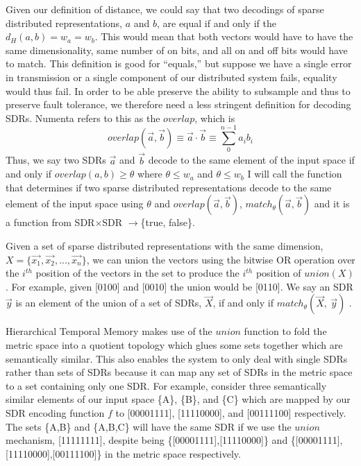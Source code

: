 \documentclass[fleqn,minimal]{article}
\begin{document}
	Given our definition of distance, we could say that two decodings of sparse distributed representations, $a$ and $b$, are equal if and only if the $d_{H}(a,b) = w_{a} = w_{b}$. This would mean that both vectors would have to have the same dimensionality, same number of on bits, and all on and off bits would have to match. This definition is good for ``equals,'' but suppose we have a single error in transmission or a single component of our distributed system fails, equality would thus fail. In order to be able preserve the ability to subsample and thus to preserve fault tolerance, we therefore need a less stringent definition for decoding SDRs. Numenta refers to this as the $overlap$, which is $$ overlap(\overrightarrow{a}, \overrightarrow{b}) \equiv \overrightarrow{a} \cdot \overrightarrow{b} \equiv \sum_{0}^{n-1} a_{i}b_{i}$$ Thus, we say two SDRs $\overrightarrow{a}$ and $\overrightarrow{b}$ decode to the same element of the input space if and only if $overlap(a,b) \geq \theta$ where $\theta \leq w_{a}$ and $\theta \leq w_{b}$ \cite{Properties} I will call the function that determines if two sparse distributed representations decode to the same element of the input space using $\theta$ and $overlap(\overrightarrow{a}, \overrightarrow{b})$, $match_{\theta}(\overrightarrow{a}, \overrightarrow{b})$ and it is a function from SDR$\times$SDR $\longrightarrow$\{true, false\}.
	
	Given a set of sparse distributed representations with the same dimension, $X =\{\overrightarrow{x_{1}}, \overrightarrow{x_{2}}, ...,\overrightarrow{x_{n}}\}$, we can union the vectors using the bitwise OR operation over the $i^{th}$ position of the vectors in the set to produce the $i^{th}$ position of $union(X)$ \cite{Properties}. For example, given [0100] and [0010] the union would be [0110]. We say an SDR $\overrightarrow{y}$ is an element of the union of a set of SDRs, $\overrightarrow{X}$, if and only if $match_{\theta}(\overrightarrow{X},\ \overrightarrow{y})$ \cite{Properties}.
	
	Hierarchical Temporal Memory makes use of the $union$ function to fold the metric space into a quotient topology which glues some sets together which are semantically similar. This also enables the system to only deal with single SDRs rather than sets of SDRs because it can map any set of SDRs in the metric space to a set containing only one SDR. For example, consider three semantically similar elements of our input space \{A\}, \{B\}, and \{C\} which are mapped by our SDR encoding function $f$ to [00001111], [11110000], and [00111100] respectively. The sets \{A,B\} and \{A,B,C\} will have the same SDR if we use the $union$ mechanism, [11111111], despite being \{[00001111],[11110000]\} and \{[00001111],[11110000],[00111100]\} in the metric space respectively.
	
\end{document}
